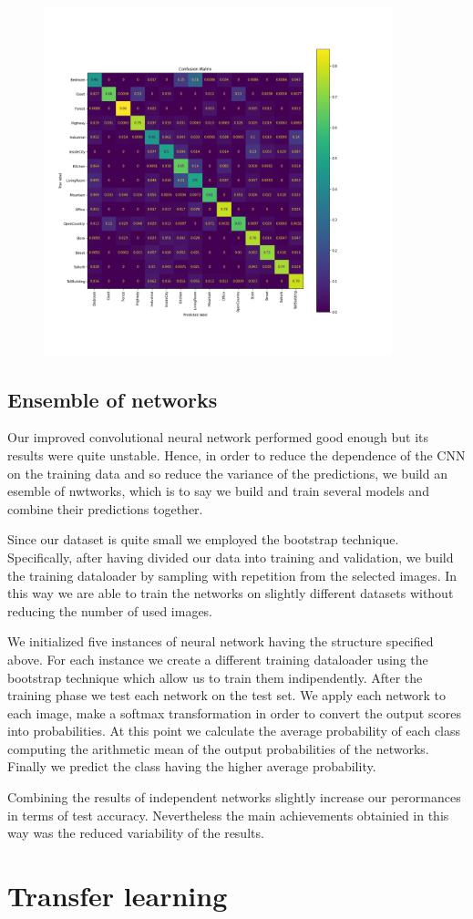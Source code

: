 \documentclass[12pt, a4paper]{report}
\begin{document}
\begin{figure}[h!]
	\centering
	\includegraphics[width=0.9\textwidth]{img/final_cmatrix_norm}
	\label{fig:cmatrix}
\end{figure}

\subsection*{Ensemble of networks}

Our improved convolutional neural network performed good enough but its results were quite unstable. Hence, in order to  reduce the dependence of the CNN on the training data and so reduce the variance of the predictions, we build an esemble of nwtworks, which is to say we build and train several models and combine their predictions together.

Since our dataset is quite small we employed the bootstrap technique. Specifically, after having divided our data into training and validation, we build the training dataloader by sampling with repetition from the selected images. In this way we are able to train the networks on slightly different datasets without reducing the number of used images.

We initialized five instances of neural network having the structure specified above. For each instance we create a different training dataloader using the bootstrap technique which allow us to train them indipendently. After the training phase we test each network on the test set. We apply each network to each image, make a softmax transformation in order to convert the output scores into probabilities. At this point we calculate the average probability of each class computing the arithmetic mean of the output probabilities of the networks. Finally we predict the class having the higher average probability.

Combining the results of independent networks slightly increase our perormances in terms of test accuracy. Nevertheless the main achievements obtainied in this way was the reduced variability of the results. 

\section{Transfer learning}
\end{document}
